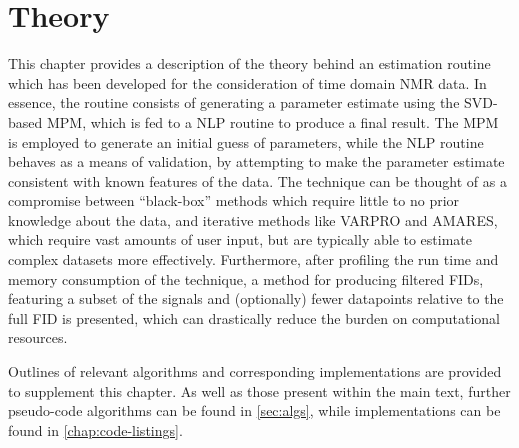 \chapter{Theory}
\label{chap:theory}

This chapter provides a description of the theory behind an estimation
routine which has been developed for the consideration of time domain \ac{NMR}
data.
In essence, the routine consists of generating a parameter estimate using the
\ac{SVD}-based \ac{MPM}, which is fed to a \ac{NLP} routine to
produce a final result. The \ac{MPM} is employed to generate an initial
guess of parameters, while the \ac{NLP} routine behaves as a means of validation,
by attempting to make the parameter estimate consistent with
known features of the data. The technique can be thought of as a compromise
between ``black-box'' methods\cite{Poullet2008} which require little to no
prior knowledge about the data, and iterative methods like \ac{VARPRO} and
\ac{AMARES}, which require vast amounts of user input, but are typically
able to estimate complex datasets more effectively.
Furthermore, after profiling the run time and memory consumption of the
technique, a method for producing filtered \acp{FID}, featuring a subset of the
signals and (optionally) fewer datapoints relative to the full \ac{FID} is
presented, which can drastically reduce the burden on computational resources.

Outlines of relevant algorithms and corresponding \Python implementations are
provided to supplement this chapter. As well as those present
within the main text, further pseudo-code algorithms can be found in
\cref{sec:algs}, while \Python implementations can be found in
\cref{chap:code-listings}.







